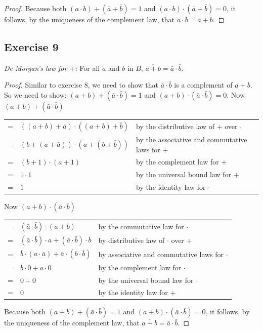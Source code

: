 \documentclass[14pt]{extarticle}
\newcommand{\cy}{\color{cyan}}
\begin{document}
\begin{proof}
Because both \((a \cdot b) + (\bar{a} + \bar{b}) = 1\) and \((a \cdot b) \cdot (\bar{a} + \bar{b}) = 0\), it follows, 
by the uniqueness of the complement law, that \(\overline{a \cdot b} = \bar{a} + \bar{b}\).
\end{proof}

\subsection{Exercise 9}
{\it De Morgan’s law for $+$:} For all $a$ and $b$ in $B$, \(\overline{a + b} = \bar{a} \cdot \bar{b}\). 

\begin{proof}
Similar to exercise 8, we need to show that \(\bar{a} \cdot \bar{b}\) is a complement of $a+b$. So we need to show: \((a+b) + (\bar{a} \cdot \bar{b}) = 1\) and 
\((a+b) \cdot (\bar{a} \cdot \bar{b}) = 0\). Now \((a+b) + (\bar{a} \cdot \bar{b})\)

\begin{center}
\begin{tabular}{cll}
= & \(((a+b) + \bar{a}) \cdot ((a + b) + \bar{b})\) & {\cy by the distributive law of + over $\cdot$} \\
= & \((b + (a + \bar{a})) \cdot (a + (b + \bar{b}))\) & {\cy by the associative and commutative laws for +} \\
= & \((b + 1) \cdot (a + 1)\) & {\cy by the complement law for +} \\
= & \(1 \cdot 1\) & {\cy by the universal bound law for +} \\
= & \(1\) & {\cy by the identity law for $\cdot$}
\end{tabular}
\end{center}

Now \((a+b) \cdot (\bar{a} \cdot \bar{b})\)

\begin{center}
\begin{tabular}{cll}
= & \((\bar{a} \cdot \bar{b}) \cdot (a+b)\) & {\cy by the commutative law for $\cdot$} \\
= & \((\bar{a}\cdot\bar{b})\cdot a + (\bar{a}\cdot\bar{b}) \cdot b\) & {\cy by distributive law of $\cdot$ over +} \\
= &\(\bar{b}\cdot(a\cdot\bar{a})+\bar{a}\cdot(b\cdot\bar{b} )\)&{\cy by associative and commutative laws for $\cdot$}\\
= & \(\bar{b} \cdot 0 + \bar{a} \cdot 0\) & {\cy by the complement law for $\cdot$} \\
= & \(0 + 0\) & {\cy by the universal bound law for $\cdot$} \\
= & \(0\) & {\cy by the identity law for +}
\end{tabular}
\end{center}

Because both \((a + b) + (\bar{a} \cdot \bar{b}) = 1\) and \((a + b) \cdot (\bar{a} \cdot \bar{b}) = 0\), it follows, 
by the uniqueness of the complement law, that \(\overline{a + b} = \bar{a} \cdot \bar{b}\).
\end{proof}
\end{document}
